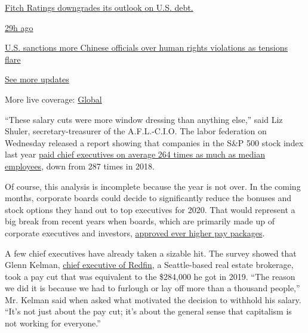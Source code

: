\href{https://www.nytimes3xbfgragh.onion/live/2020/07/31/business/stock-market-today-coronavirus?action=click\&pgtype=Article\&state=default\&region=MAIN_CONTENT_1\&context=storylines_live_updates\#fitch-ratings-downgrades-its-outlook-on-us-debt}{Fitch
Ratings downgrades its outlook on U.S. debt.}

\href{https://www.nytimes3xbfgragh.onion/live/2020/07/31/business/stock-market-today-coronavirus?action=click\&pgtype=Article\&state=default\&region=MAIN_CONTENT_1\&context=storylines_live_updates\#us-sanctions-more-chinese-officials-over-human-rights-violations-as-tensions-flare}{29h
ago}

\href{https://www.nytimes3xbfgragh.onion/live/2020/07/31/business/stock-market-today-coronavirus?action=click\&pgtype=Article\&state=default\&region=MAIN_CONTENT_1\&context=storylines_live_updates\#us-sanctions-more-chinese-officials-over-human-rights-violations-as-tensions-flare}{U.S.
sanctions more Chinese officials over human rights violations as
tensions flare}

\href{https://www.nytimes3xbfgragh.onion/live/2020/07/31/business/stock-market-today-coronavirus?action=click\&pgtype=Article\&state=default\&region=MAIN_CONTENT_1\&context=storylines_live_updates}{See
more updates}

More live coverage:
\href{https://www.nytimes3xbfgragh.onion/2020/08/01/world/coronavirus-covid-19.html?action=click\&pgtype=Article\&state=default\&region=MAIN_CONTENT_1\&context=storylines_live_updates}{Global}

``These salary cuts were more window dressing than anything else,'' said
Liz Shuler, secretary-treasurer of the A.F.L.-C.I.O. The labor
federation on Wednesday released a report showing that companies in the
S\&P 500 stock index last year \href{https://aflcio.org/paywatch}{paid
chief executives on average 264 times as much as median employees}, down
from 287 times in 2018.

Of course, this analysis is incomplete because the year is not over. In
the coming months, corporate boards could decide to significantly reduce
the bonuses and stock options they hand out to top executives for 2020.
That would represent a big break from recent years when boards, which
are primarily made up of corporate executives and investors,
\href{https://www.nytimes3xbfgragh.onion/2019/05/24/business/highest-paid-ceos-2018.html}{approved
ever higher pay packages}.

A few chief executives have already taken a sizable hit. The survey
showed that Glenn Kelman,
\href{https://www.nytimes3xbfgragh.onion/2016/07/10/technology/a-start-up-shies-away-from-the-gig-economy.html}{chief
executive of Redfin}, a Seattle-based real estate brokerage, took a pay
cut that was equivalent to the \$284,000 he got in 2019. ``The reason we
did it is because we had to furlough or lay off more than a thousand
people,'' Mr. Kelman said when asked what motivated the decision to
withhold his salary. ``It's not just about the pay cut; it's about the
general sense that capitalism is not working for everyone.''

